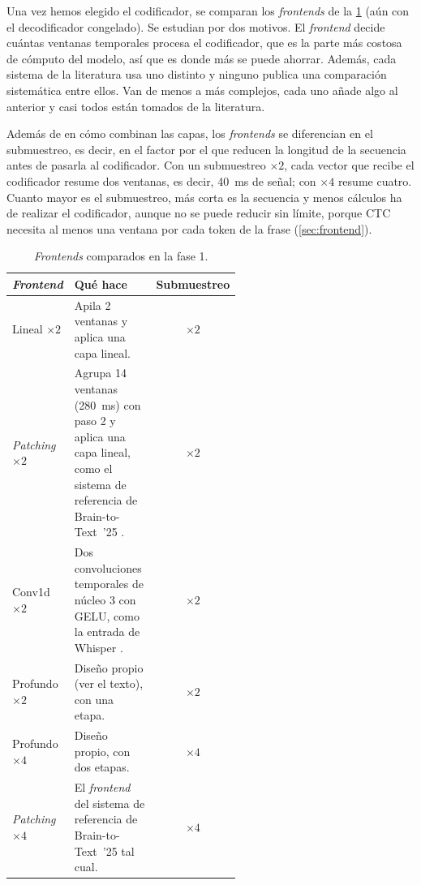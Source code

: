 Una vez hemos elegido el codificador, se comparan los \textit{frontends} de la \cref{tab:frontends} (aún con el decodificador congelado). Se estudian por dos motivos. El \textit{frontend} decide cuántas ventanas temporales procesa el codificador, que es la parte más costosa de cómputo del modelo, así que es donde más se puede ahorrar. Además, cada sistema de la literatura usa uno distinto y ninguno publica una comparación sistemática entre ellos. Van de menos a más complejos, cada uno añade algo al anterior y casi todos están tomados de la literatura.

Además de en cómo combinan las capas, los \textit{frontends} se diferencian en el submuestreo, es decir, en el factor por el que reducen la longitud de la secuencia antes de pasarla al codificador. Con un submuestreo $\times 2$, cada vector que recibe el codificador resume dos ventanas, es decir, \SI{40}{\milli\second} de señal; con $\times 4$ resume cuatro. Cuanto mayor es el submuestreo, más corta es la secuencia y menos cálculos ha de realizar el codificador, aunque no se puede reducir sin límite, porque CTC necesita al menos una ventana por cada token de la frase (\cref{sec:frontend}).

\begin{table}[htbp]
  \centering
  \caption{\textit{Frontends} comparados en la fase 1.}
  \label{tab:frontends}
  \small
  \begin{tabular}{l>{\raggedright\arraybackslash}p{0.56\linewidth}c}
    \toprule
    \textbf{\textit{Frontend}} & \textbf{Qué hace} & \textbf{Submuestreo} \\
    \midrule
    Lineal $\times 2$    & Apila 2 ventanas y aplica una capa lineal. & $\times 2$ \\
    \textit{Patching} $\times 2$ & Agrupa 14 ventanas (\SI{280}{\milli\second}) con paso 2 y aplica una capa lineal, como el sistema de referencia de Brain-to-Text~'25 \cite{b2t25}. & $\times 2$ \\
    Conv1d $\times 2$    & Dos convoluciones temporales de núcleo 3 con GELU, como la entrada de Whisper \cite{radford2023whisper}. & $\times 2$ \\
    Profundo $\times 2$  & Diseño propio (ver el texto), con una etapa. & $\times 2$ \\
    Profundo $\times 4$  & Diseño propio, con dos etapas. & $\times 4$ \\
    \textit{Patching} $\times 4$ & El \textit{frontend} del sistema de referencia de Brain-to-Text~'25 tal cual. & $\times 4$ \\
    \bottomrule
  \end{tabular}
\end{table}

